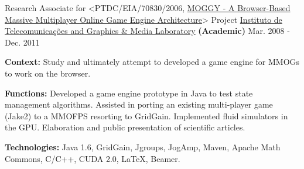 \begin{cventries}
  \cventry
    {Research Associate for <PTDC/EIA/70830/2006, \href{http://www.di.ubi.pt/~agomes/moggy/index.html}{MOGGY - A Browser-Based Massive Multiplayer Online Game Engine Architecture}> Project} %
    {\href{http://www.it.ubi.pt/medialab}{Instituto de Telecomunica\c{c}\~{o}es and Graphics \& Media Laboratory} \textbf{(Academic)}} %
    {} %
    {Mar. 2008 - Dec. 2011} %
    {
      \begin{cvitems} %
		\item {\textbf{Context:} Study and ultimately attempt to developed a game engine for MMOGs to work on the browser.}
		\item {\textbf{Functions:} Developed a game engine prototype in Java to test state management algorithms. Assisted in porting an existing multi-player game (Jake2) to a MMOFPS resorting to GridGain. Implemented fluid simulators in the GPU. Elaboration and public presentation of scientific articles.}
		\item {\textbf{Technologies:} Java 1.6, GridGain, Jgroups, JogAmp, Maven, Apache Math Commons, C/C++, CUDA 2.0, LaTeX,  Beamer.} %
      \end{cvitems}
    }     
    

\end{cventries}
